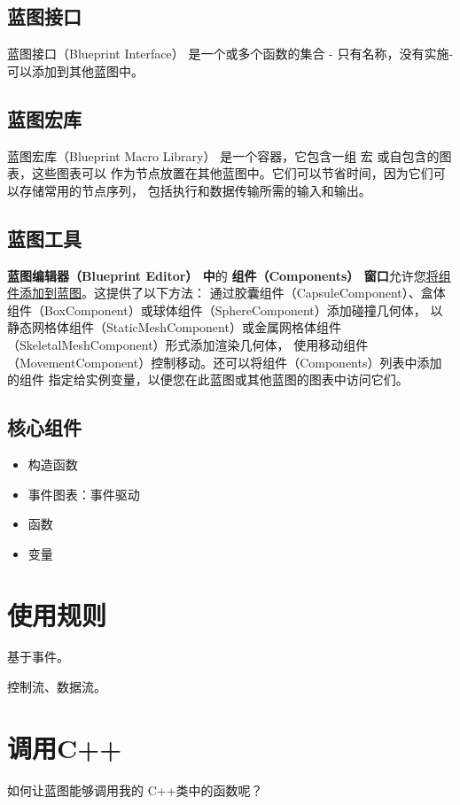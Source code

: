 \documentclass[UTF8,a4paper,12pt]{ctexbook}
\begin{document}
		\subsection{蓝图接口}
			蓝图接口（Blueprint Interface） 是一个或多个函数的集合 - 只有名称，没有实施-可以添加到其他蓝图中。
		
		\subsection{蓝图宏库}
			蓝图宏库（Blueprint Macro Library） 是一个容器，它包含一组 宏 或自包含的图表，这些图表可以 作为节点放置在其他蓝图中。它们可以节省时间，因为它们可以存储常用的节点序列， 包括执行和数据传输所需的输入和输出。
		
		\subsection{蓝图工具}
			\textbf{蓝图编辑器（Blueprint Editor） 中}的 \textbf{组件（Components） 窗口}允许您\underline{将组件添加到蓝图}。这提供了以下方法： 通过胶囊组件（CapsuleComponent）、盒体组件（BoxComponent）或球体组件（SphereComponent）添加碰撞几何体， 以静态网格体组件（StaticMeshComponent）或金属网格体组件（SkeletalMeshComponent）形式添加渲染几何体， 使用移动组件（MovementComponent）控制移动。还可以将组件（Components）列表中添加的组件 指定给实例变量，以便您在此蓝图或其他蓝图的图表中访问它们。
		
		
		\subsection{核心组件}
			\begin{itemize}
				\item 构造函数 
				\item 事件图表：事件驱动
				\item 函数
				\item 变量
			\end{itemize}
			
	\section{使用规则}
		基于事件。
		
		控制流、数据流。
		
		
	\section{调用C++}
		如何让蓝图能够调用我的 C++类中的函数呢？
		
\end{document}
